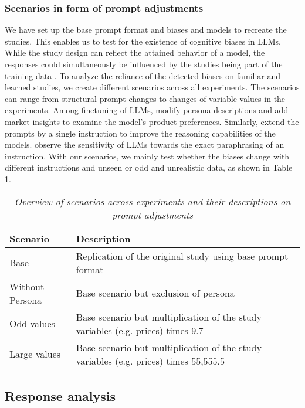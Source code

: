 \subsubsection{Scenarios in form of prompt adjustments}
\label{methodologies:scenarios}
\par We have set up the base prompt format and biases and models to recreate the studies. This enables us to test for the existence of cognitive biases in LLMs. While the study design can reflect the attained behavior of a model, the responses could simultaneously be influenced by the studies being part of the training data \parencite{brand2023using}. To analyze the reliance of the detected biases on familiar and learned studies, we create different scenarios across all experiments. The scenarios can range from structural prompt changes to changes of variable values in the experiments. Among finetuning of LLMs, \textcite{brand2023using} modify persona descriptions and add market insights to examine the model's product preferences. Similarly, \textcite{kojima2022large} extend the prompts by a single instruction to improve the reasoning capabilities of the models. \textcite{mizrahi2024state} observe the sensitivity of LLMs towards the exact paraphrasing of an instruction. With our scenarios, we mainly test whether the biases change with different instructions and unseen or odd and unrealistic data, as shown in Table \ref{tab:scenarios}.
\begin{table}[h!]
    \centering
    \begin{tabular}{@{}p{4cm}p{11cm}@{}}
    \toprule
    \textbf{Scenario} & \textbf{Description} \\ \midrule
    Base & Replication of the original study using base prompt format \\ \addlinespace
    Without Persona & Base scenario but exclusion of persona \\ \addlinespace
    Odd values & Base scenario but multiplication of the study variables (e.g. prices) times 9.7 \\ \addlinespace
    Large values & Base scenario but multiplication of the study variables (e.g. prices) times 55,555.5 \\ \bottomrule
    \end{tabular}
    \caption[Overview of prompt scenarios]{\centering \textit{Overview of scenarios across experiments and their descriptions on prompt adjustments}}
    \label{tab:scenarios}
\end{table}


\subsection{Response analysis}

